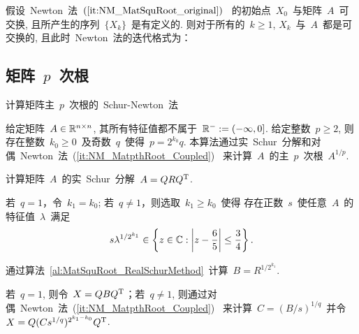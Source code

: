 \begin{lemma}
假设~Newton~法~$(\ref{it:NM_MatSquRoot_original})$~
的初始点~$X_0$~与矩阵~$A$~可交换,
且所产生的序列~$\{X_k\}$~是有定义的. 则对于所有的~$k\geq1$,
$X_k$~与~$A$~都是可交换的,  且此时~Newton~法的迭代格式为：



\subsection{矩阵~$p$~次根}




\begin{algorithm}[h!]
\caption{计算矩阵主~$p$~次根的~Schur-Newton~法~\cite[算法~
3]{Iannazzo2008}} \label{al:MatpthRoot_SchurNewton_Ian08}
给定矩阵~$A\in\mathbb{R}^{n\times n}$, 其所有特征值都不属于~$\mathbb{R}^- :=
(-\infty,0]$. 给定整数~$p\geq 2$, 则存在整数~$k_0 \geq
0$~及奇数~$q$~使得~$p = 2^{k_0}q$.
本算法通过实~Schur~分解和对偶~Newton~法~(\ref{it:NM_MatpthRoot_Coupled})~
来计算~$A$~的主~$p$~次根~$A^{1/p}$.
\begin{list}{.}{
\setlength{\rightmargin}{0em}\setlength{\leftmargin}{1.2em}}
\item
计算矩阵~$A$~的实~Schur~分解~$A = QR{Q}^\mathrm{T}$.
\item
若~$q=1$，令~$k_1 = k_0$; 若~$q\neq1$，则选取~$k_1\geq k_0$~使得
存在正数~$s$~使任意~$A$~的特征值~$\lambda$~满足
$$
s \lambda^{1/{2^{k_1}}} \in \left\{z\in \mathbb{C}: \left|z -
\frac{6}{5}\right| \leq \frac{3}{4}\right\}.
$$
\item
通过算法~\ref{al:MatSquRoot_RealSchurMethod}~计算~$B =
R^{1/{2^{k_1}}}$.
\item
若~$q=1$, 则令~$X = QB{Q}^\mathrm{T}$；若~$q\neq 1$,
则通过对偶~Newton~法~(\ref{it:NM_MatpthRoot_Coupled})~ 来计算~$C =
(B/s)^{1/q}$~并令~$X = Q(Cs^{1/q})^{2^{k_1-k_0}}{Q}^\mathrm{T}$.
\end{list}
\end{algorithm}




\end{lemma}
